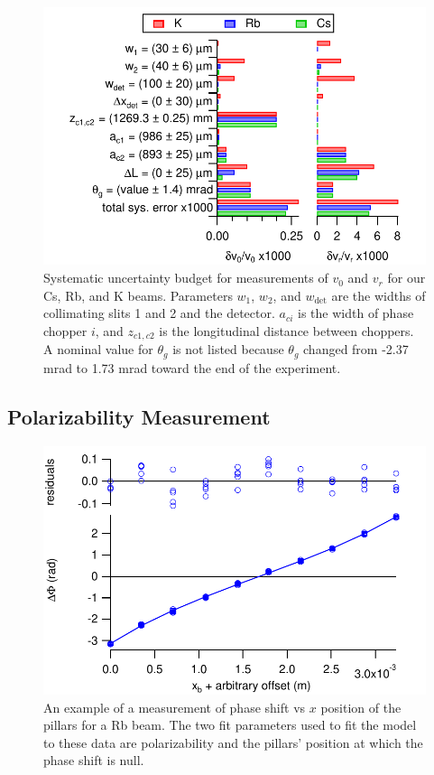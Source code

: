 \documentclass[twocolumn,prl,showpacs,superscriptaddress]{revtex4-1}   %
\begin{document}
\begin{figure}
\includegraphics[width=\linewidth,keepaspectratio]{displayVelErrors.pdf}
\caption{\label{velError}Systematic uncertainty budget for measurements of $v_0$ and $v_r$ for our Cs, Rb, and K beams. Parameters $w_1$, $w_2$, and $w_{\mathrm{det}}$ are the widths of collimating slits 1 and 2 and the detector. $a_{ci}$ is the width of phase chopper $i$, and $z_{c1,c2}$ is the longitudinal distance between choppers. A nominal value for $\theta_g$ is not listed because $\theta_g$ changed from -2.37 mrad to 1.73 mrad toward the end of the experiment.}
\end{figure}

\subsection{Polarizability Measurement}

\begin{figure}
\includegraphics[width=\linewidth,keepaspectratio]{dPvMP_150327_q.pdf}
\caption{\label{dPvMPExample}An example of a measurement of phase shift vs $x$ position of the pillars for a Rb beam. The two fit parameters used to fit the model to these data are polarizability and the pillars' position at which the phase shift is null.}
\end{figure}
\end{document}

